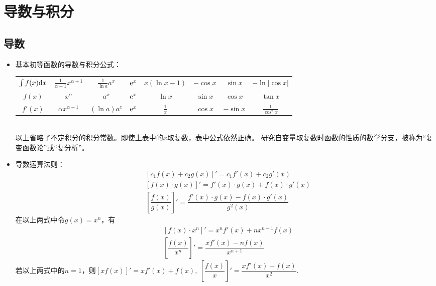 \chapter{导数与积分}

\section{导数}
\begin{itemize}[leftmargin=\inteval{\myitemleftmargin}pt,itemsep=
   \inteval{\myitemitempsep}pt,topsep=\inteval{\myitemtopsep}pt]
\item 基本初等函数的导数与积分公式：
\begin{table}[h]
\centering
\begin{tabular}{c|c|c|c|c|c|c|c}
    \hline
    $ \int f(x)\mathrm{d} x $& $ \frac{1}{\alpha+1}x^{\alpha+1} $ & $ \frac{1}{\ln a}a^x $ &
    $ \mathrm{e}^x $ & $ x(\ln x-1) $ & $ -\cos x $ & $ \sin x $ & $  -\ln|\cos x| $ \\
    $ f(x) $ & $ x^{\alpha} $ & $ a^x $ & $ \mathrm{e}^x $ & $ \ln x $ & $ \sin x $ & 
    $ \cos  x $ & $ \tan x $ \\
    $ f'(x) $ & $ \alpha x^{\alpha-1} $ & $ (\ln a) a^x $ & $ \mathrm{e}^x $ & 
    $ \frac{1}{x} $ & $ \cos x $ & $ -\sin x $ & $ \frac{1}{\cos ^2 x} $ \\
    \hline
\end{tabular}
\end{table} \\
以上省略了不定积分的积分常数。即使上表中的$ x $取复数，表中公式依然正确。
研究自变量取复数时函数的性质的数学分支，被称为“复变函数论”或“复分析”。

\item 导数运算法则：
\begin{align*}
    & \left[c_1f(x)+c_2g(x)\right]'=c_1f'(x)+c_2g'(x) \\
    & \left[f(x)\cdot g(x) \right]'= f'(x)\cdot g(x)+f(x)\cdot g'(x) \\
    & \left[ \dfrac{f(x)}{g(x)}\right]' =\dfrac{f'(x)\cdot g(x)-f(x)\cdot g'(x)}{g^2(x)}
\end{align*}
在以上两式中令$ g(x)=x^n $，有
\begin{align*}
	& \left[f(x)\cdot x^n \right]'= x^n f'(x)+nx^{n-1}f(x) \\
	& \left[ \dfrac{f(x)}{x^n}\right]' =\dfrac{xf'(x)-nf(x)}{x^{n+1}}
\end{align*}
若以上两式中的$ n=1 $，则$ [xf(x)]'=xf'(x)+f(x),\ \left[ \dfrac{f(x)}{x}\right]'=\dfrac{xf'(x)-f(x)}{x^{2}} $.


\end{itemize}
